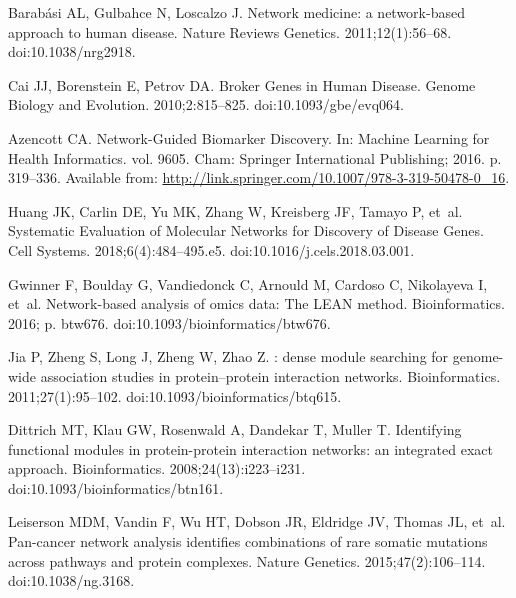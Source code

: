 \documentclass[10pt,letterpaper]{article}
\begin{document}
\begin{thebibliography}{10}
  Barabási AL, Gulbahce N, Loscalzo J.
  \newblock Network medicine: a network-based approach to human disease.
  \newblock Nature Reviews Genetics. 2011;12(1):56--68.
  \newblock doi:{10.1038/nrg2918}.
  
  Cai JJ, Borenstein E, Petrov DA.
  \newblock Broker {Genes} in {Human} {Disease}.
  \newblock Genome Biology and Evolution. 2010;2:815--825.
  \newblock doi:{10.1093/gbe/evq064}.
  
  Azencott CA.
  \newblock Network-{Guided} {Biomarker} {Discovery}.
  \newblock In: Machine {Learning} for {Health} {Informatics}. vol. 9605. Cham:
    Springer International Publishing; 2016. p. 319--336.
  \newblock Available from:
    \url{http://link.springer.com/10.1007/978-3-319-50478-0_16}.
  
  Huang JK, Carlin DE, Yu MK, Zhang W, Kreisberg JF, Tamayo P, et~al.
  \newblock Systematic {Evaluation} of {Molecular} {Networks} for {Discovery} of
    {Disease} {Genes}.
  \newblock Cell Systems. 2018;6(4):484--495.e5.
  \newblock doi:{10.1016/j.cels.2018.03.001}.
  
  Gwinner F, Boulday G, Vandiedonck C, Arnould M, Cardoso C, Nikolayeva I, et~al.
  \newblock Network-based analysis of omics data: {The} {LEAN} method.
  \newblock Bioinformatics. 2016; p. btw676.
  \newblock doi:{10.1093/bioinformatics/btw676}.
  
  Jia P, Zheng S, Long J, Zheng W, Zhao Z.
  : dense module searching for genome-wide association studies
    in protein–protein interaction networks.
  \newblock Bioinformatics. 2011;27(1):95--102.
  \newblock doi:{10.1093/bioinformatics/btq615}.
  
  Dittrich MT, Klau GW, Rosenwald A, Dandekar T, Muller T.
  \newblock Identifying functional modules in protein-protein interaction
    networks: an integrated exact approach.
  \newblock Bioinformatics. 2008;24(13):i223--i231.
  \newblock doi:{10.1093/bioinformatics/btn161}.
  
  Leiserson MDM, Vandin F, Wu HT, Dobson JR, Eldridge JV, Thomas JL, et~al.
  \newblock Pan-cancer network analysis identifies combinations of rare somatic
    mutations across pathways and protein complexes.
  \newblock Nature Genetics. 2015;47(2):106--114.
  \newblock doi:{10.1038/ng.3168}.
  

\end{thebibliography}
\end{document}
